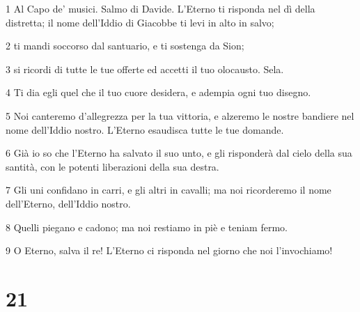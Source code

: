 \par 1 Al Capo de' musici. Salmo di Davide. L'Eterno ti risponda nel dì della distretta; il nome dell'Iddio di Giacobbe ti levi in alto in salvo;
\par 2 ti mandi soccorso dal santuario, e ti sostenga da Sion;
\par 3 si ricordi di tutte le tue offerte ed accetti il tuo olocausto. Sela.
\par 4 Ti dia egli quel che il tuo cuore desidera, e adempia ogni tuo disegno.
\par 5 Noi canteremo d'allegrezza per la tua vittoria, e alzeremo le nostre bandiere nel nome dell'Iddio nostro. L'Eterno esaudisca tutte le tue domande.
\par 6 Già io so che l'Eterno ha salvato il suo unto, e gli risponderà dal cielo della sua santità, con le potenti liberazioni della sua destra.
\par 7 Gli uni confidano in carri, e gli altri in cavalli; ma noi ricorderemo il nome dell'Eterno, dell'Iddio nostro.
\par 8 Quelli piegano e cadono; ma noi restiamo in piè e teniam fermo.
\par 9 O Eterno, salva il re! L'Eterno ci risponda nel giorno che noi l'invochiamo!

\chapter{21}


